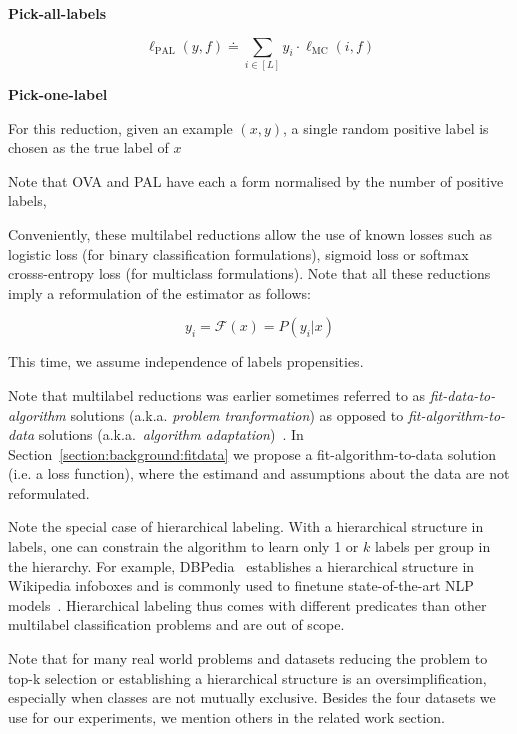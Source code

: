 \textbf{Pick-all-labels}

\begin{equation}
\ell_{\mathrm{PAL}}(y, f) \doteq \sum_{i \in[L]} y_{i} \cdot \ell_{\mathrm{MC}}(i, f)
\end{equation}

\textbf{Pick-one-label}

For this reduction, given an example $(x,y)$, a single random positive label is chosen as the true label of $x$


Note that OVA and PAL have each a form normalised by the number of positive labels, 


Conveniently, these multilabel reductions allow the use of known losses such as logistic loss (for binary classification formulations), sigmoid loss or softmax crosss-entropy loss (for multiclass formulations). Note that all these reductions imply a reformulation of the estimator as follows:

\begin{equation}
  y_i = \mathcal{F}(x) = P(y_i | x)
\end{equation}

This time, we assume independence of labels propensities. 


Note that multilabel reductions was earlier sometimes referred to as \emph{fit-data-to-algorithm} solutions (a.k.a. \emph{problem tranformation}) as opposed to \emph{fit-algorithm-to-data} solutions (a.k.a.\ \emph{algorithm adaptation})~\cite{multilabelReview, multilabelReview2}. In Section~\ref{section:background:fitdata} we propose a fit-algorithm-to-data solution (i.e. a loss function), where the estimand and assumptions about the data are not reformulated.

Note the special case of hierarchical labeling. With a hierarchical structure in labels, one can constrain the algorithm to learn only 1 or $k$ labels per group in the hierarchy. For example, DBPedia~\citep{lehmann2015dbpedia} establishes a hierarchical structure in Wikipedia infoboxes and is commonly used to finetune state-of-the-art NLP models~\citep[see, e.g.,][]{XLNet, ULMFit}. Hierarchical labeling thus comes with different predicates than other multilabel classification problems and are out of scope.

Note that for many real world problems and datasets reducing the problem to top-k selection or establishing a hierarchical structure is an oversimplification, especially when classes are not mutually exclusive. Besides the four datasets we use for our experiments, we mention others in the related work section.

